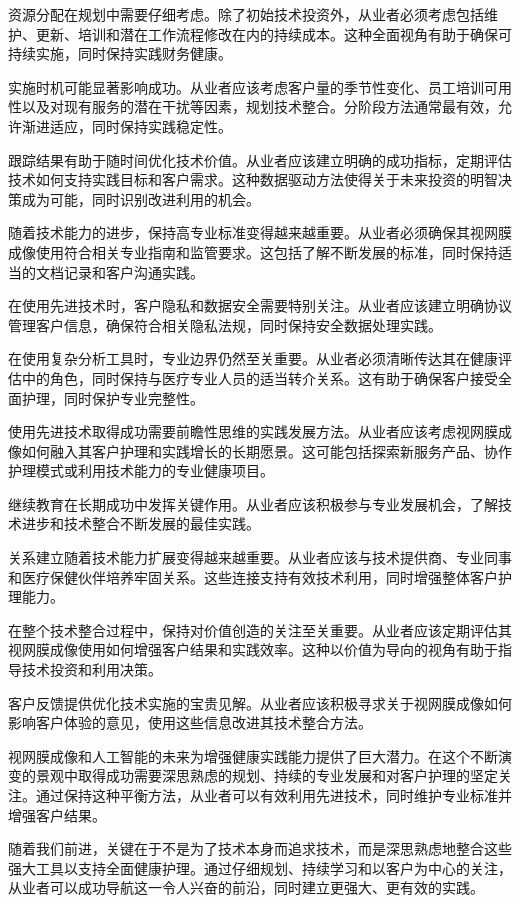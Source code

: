 \documentclass[
  Letterpaper,
]{scrbook}
\begin{document}
资源分配在规划中需要仔细考虑。除了初始技术投资外，从业者必须考虑包括维护、更新、培训和潜在工作流程修改在内的持续成本。这种全面视角有助于确保可持续实施，同时保持实践财务健康。

实施时机可能显著影响成功。从业者应该考虑客户量的季节性变化、员工培训可用性以及对现有服务的潜在干扰等因素，规划技术整合。分阶段方法通常最有效，允许渐进适应，同时保持实践稳定性。

跟踪结果有助于随时间优化技术价值。从业者应该建立明确的成功指标，定期评估技术如何支持实践目标和客户需求。这种数据驱动方法使得关于未来投资的明智决策成为可能，同时识别改进利用的机会。

随着技术能力的进步，保持高专业标准变得越来越重要。从业者必须确保其视网膜成像使用符合相关专业指南和监管要求。这包括了解不断发展的标准，同时保持适当的文档记录和客户沟通实践。

在使用先进技术时，客户隐私和数据安全需要特别关注。从业者应该建立明确协议管理客户信息，确保符合相关隐私法规，同时保持安全数据处理实践。

在使用复杂分析工具时，专业边界仍然至关重要。从业者必须清晰传达其在健康评估中的角色，同时保持与医疗专业人员的适当转介关系。这有助于确保客户接受全面护理，同时保护专业完整性。

使用先进技术取得成功需要前瞻性思维的实践发展方法。从业者应该考虑视网膜成像如何融入其客户护理和实践增长的长期愿景。这可能包括探索新服务产品、协作护理模式或利用技术能力的专业健康项目。

继续教育在长期成功中发挥关键作用。从业者应该积极参与专业发展机会，了解技术进步和技术整合不断发展的最佳实践。

关系建立随着技术能力扩展变得越来越重要。从业者应该与技术提供商、专业同事和医疗保健伙伴培养牢固关系。这些连接支持有效技术利用，同时增强整体客户护理能力。

在整个技术整合过程中，保持对价值创造的关注至关重要。从业者应该定期评估其视网膜成像使用如何增强客户结果和实践效率。这种以价值为导向的视角有助于指导技术投资和利用决策。

客户反馈提供优化技术实施的宝贵见解。从业者应该积极寻求关于视网膜成像如何影响客户体验的意见，使用这些信息改进其技术整合方法。

视网膜成像和人工智能的未来为增强健康实践能力提供了巨大潜力。在这个不断演变的景观中取得成功需要深思熟虑的规划、持续的专业发展和对客户护理的坚定关注。通过保持这种平衡方法，从业者可以有效利用先进技术，同时维护专业标准并增强客户结果。

随着我们前进，关键在于不是为了技术本身而追求技术，而是深思熟虑地整合这些强大工具以支持全面健康护理。通过仔细规划、持续学习和以客户为中心的关注，从业者可以成功导航这一令人兴奋的前沿，同时建立更强大、更有效的实践。
\end{document}
